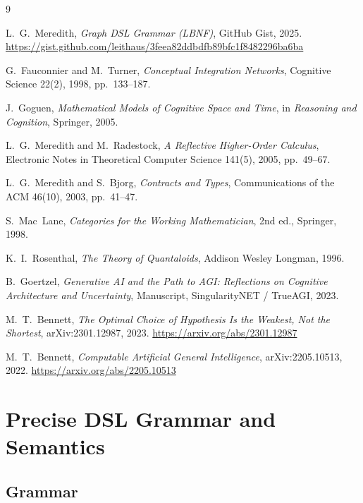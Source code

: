 \documentclass[11pt, a4paper]{article}
\theoremstyle{definition}
\theoremstyle{plain}
\theoremstyle{remark}
\begin{document}
\begin{thebibliography}{9}

L.~G.~Meredith,
\textit{Graph DSL Grammar (LBNF)},
GitHub Gist, 2025.
\url{https://gist.github.com/leithaus/3feea82ddbdfb89bfc1f8482296ba6ba}

G.~Fauconnier and M.~Turner,
\textit{Conceptual Integration Networks},
Cognitive Science 22(2), 1998, pp.~133--187.

J.~Goguen,
\textit{Mathematical Models of Cognitive Space and Time},
in \textit{Reasoning and Cognition}, Springer, 2005.

L.~G.~Meredith and M.~Radestock,
\textit{A Reflective Higher-Order Calculus},
Electronic Notes in Theoretical Computer Science 141(5), 2005, pp.~49--67.

L.~G.~Meredith and S.~Bjorg,
\textit{Contracts and Types},
Communications of the ACM 46(10), 2003, pp.~41--47.

S.~Mac~Lane,
\textit{Categories for the Working Mathematician}, 2nd ed.,
Springer, 1998.

K.~I.~Rosenthal,
\textit{The Theory of Quantaloids},
Addison Wesley Longman, 1996.

B.~Goertzel,
\textit{Generative AI and the Path to AGI: Reflections on Cognitive
Architecture and Uncertainty},
Manuscript, SingularityNET / TrueAGI, 2023.

M.~T.~Bennett,
\textit{The Optimal Choice of Hypothesis Is the Weakest, Not the Shortest},
arXiv:2301.12987, 2023.
\url{https://arxiv.org/abs/2301.12987}

M.~T.~Bennett,
\textit{Computable Artificial General Intelligence},
arXiv:2205.10513, 2022.
\url{https://arxiv.org/abs/2205.10513}

\end{thebibliography}

\appendix
\appendixpage
\addappheadtotoc

\section{Precise DSL Grammar and Semantics}
\label{app:dsl}

\subsection{Grammar}
\end{document}
